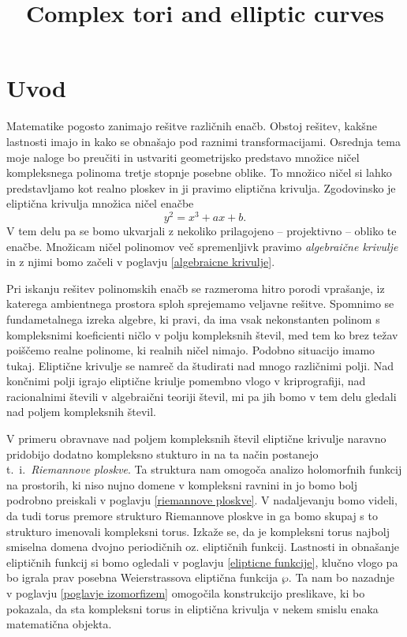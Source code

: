 \documentclass[mat1]{fmfdelo}
\title{Complex tori and elliptic curves}
\numberwithin{equation}{section}
\theoremstyle{definition}
\begin{document}
\pagecolor{material-theme}
\color{white}


\section{Uvod}

Matematike pogosto zanimajo rešitve različnih enačb. Obstoj rešitev, kakšne lastnosti imajo in
kako se obnašajo pod raznimi transformacijami. Osrednja tema moje naloge bo preučiti in ustvariti
geometrijsko predstavo množice ničel kompleksnega polinoma tretje stopnje posebne oblike. 
To množico ničel si lahko predstavljamo kot realno ploskev in ji pravimo eliptična krivulja.   
Zgodovinsko je eliptična krivulja množica ničel enačbe
\[
    y^2 = x^3 + ax + b. 
\]
V tem delu pa se bomo ukvarjali z nekoliko prilagojeno -- projektivno -- obliko te enačbe. Množicam ničel
polinomov več spremenljivk pravimo \emph{algebraične krivulje} in z njimi bomo začeli v poglavju \ref{algebraicne krivulje}. 
\par 
Pri iskanju rešitev
polinomskih enačb se razmeroma hitro porodi vprašanje, iz katerega ambientnega prostora 
sploh sprejemamo veljavne rešitve. Spomnimo se fundametalnega izreka algebre, ki pravi, da ima
vsak nekonstanten polinom s kompleksnimi koeficienti ničlo v polju kompleksnih števil, med tem
ko brez težav poiščemo realne polinome, ki realnih ničel nimajo. Podobno situacijo imamo tukaj. 
Eliptične krivulje se namreč da študirati nad mnogo različnimi polji. Nad končnimi polji igrajo
eliptične kriulje pomembno vlogo v kriprografiji, nad racionalnimi števili v algebraični teoriji
števil, mi pa jih bomo v tem delu gledali nad poljem kompleksnih števil. 
\par
V primeru obravnave nad poljem kompleksnih števil eliptične
krivulje naravno pridobijo dodatno kompleksno stukturo in na ta način postanejo t.~i.\ \emph{Riemannove ploskve}. Ta struktura nam omogoča analizo holomorfnih funkcij na prostorih, ki niso nujno domene v kompleksni ravnini in jo
bomo bolj podrobno preiskali v poglavju \ref{riemannove ploskve}. V nadaljevanju bomo videli, da tudi torus premore strukturo Riemannove ploskve in ga bomo skupaj s to strukturo imenovali kompleksni torus. Izkaže se, da je kompleksni
torus najbolj smiselna domena dvojno periodičnih oz. eliptičnih funkcij. Lastnosti in obnašanje eliptičnih funkcij si bomo ogledali v poglavju \ref{elipticne funkcije}, klučno vlogo pa bo igrala prav posebna Weierstrassova eliptična funkcija $\wp$. Ta nam bo nazadnje v poglavju \ref{poglavje izomorfizem} omogočila konstrukcijo preslikave, ki bo pokazala, da sta kompleksni torus in eliptična krivulja v nekem smislu enaka matematična objekta.
\end{document}
